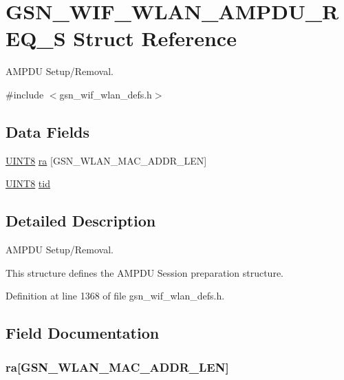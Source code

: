 \hypertarget{a00366}{
\section{GSN\_\-WIF\_\-WLAN\_\-AMPDU\_\-REQ\_\-S Struct Reference}
\label{a00366}
}


AMPDU Setup/Removal.  




{\ttfamily \#include $<$gsn\_\-wif\_\-wlan\_\-defs.h$>$}

\subsection*{Data Fields}
\begin{DoxyCompactItemize}
\item 
\hyperlink{a00660_gab27e9918b538ce9d8ca692479b375b6a}{UINT8} \hyperlink{a00366_a1d97eb2e070b4a95218b41f6abbff9d7}{ra} \mbox{[}GSN\_\-WLAN\_\-MAC\_\-ADDR\_\-LEN\mbox{]}
\item 
\hyperlink{a00660_gab27e9918b538ce9d8ca692479b375b6a}{UINT8} \hyperlink{a00366_abf69ed815c8482f9995e41bc0aff9043}{tid}
\end{DoxyCompactItemize}


\subsection{Detailed Description}
AMPDU Setup/Removal. 

This structure defines the AMPDU Session preparation structure. 

Definition at line 1368 of file gsn\_\-wif\_\-wlan\_\-defs.h.



\subsection{Field Documentation}
\hypertarget{a00366_a1d97eb2e070b4a95218b41f6abbff9d7}{
\subsubsection[{ra}]{ {\bf ra}\mbox{[}GSN\_\-WLAN\_\-MAC\_\-ADDR\_\-LEN\mbox{]}}}
\label{a00366_a1d97eb2e070b4a95218b41f6abbff9d7}


